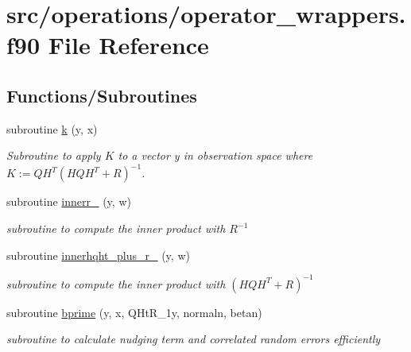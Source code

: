 \hypertarget{operator__wrappers_8f90}{\section{src/operations/operator\-\_\-wrappers.f90 File Reference}
\label{operator__wrappers_8f90}
}
\subsection*{Functions/\-Subroutines}
\begin{DoxyCompactItemize}
\item 
subroutine \hyperlink{operator__wrappers_8f90_aec571ade653c1cf8fd6cde17285af055}{k} (y, x)
\begin{DoxyCompactList}\small\item\em Subroutine to apply $K$ to a vector y in observation space where $K := QH^T(HQH^T+R)^{-1}$. \end{DoxyCompactList}\item 
subroutine \hyperlink{operator__wrappers_8f90_adb7f01ab90a983549eaf0ebb1f5c8289}{innerr\-\_} (y, w)
\begin{DoxyCompactList}\small\item\em subroutine to compute the inner product with $R^{-1}$ \end{DoxyCompactList}\item 
subroutine \hyperlink{operator__wrappers_8f90_a2bdcf5ca1fde3d87061ae8e984b4c1d9}{innerhqht\-\_\-plus\-\_\-r\-\_} (y, w)
\begin{DoxyCompactList}\small\item\em subroutine to compute the inner product with $(HQH^T+R)^{-1}$ \end{DoxyCompactList}\item 
subroutine \hyperlink{operator__wrappers_8f90_a96d0c9700917cd1bcb959b2d96e27036}{bprime} (y, x, Q\-Ht\-R\-\_\-1y, normaln, betan)
\begin{DoxyCompactList}\small\item\em subroutine to calculate nudging term and correlated random errors efficiently \end{DoxyCompactList}\end{DoxyCompactItemize}


